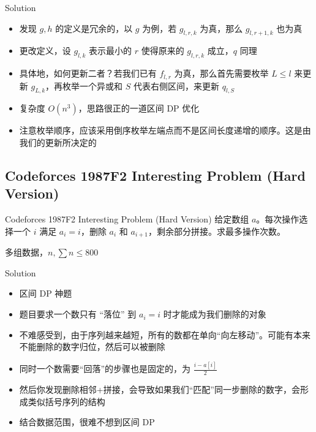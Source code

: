 ﻿\documentclass[aspectratio=169]{ctexbeamer}
\begin{document}
\begin{frame}{Solution}
    \begin{itemize}
        \item 发现 $g,h$ 的定义是冗余的，以 $g$ 为例，若 $g_{l,r,k}$ 为真，那么 $g_{l,r+1,k}$ 也为真
        \item 更改定义，设 $g_{l,k}$ 表示最小的 $r$ 使得原来的 $g_{l,r,k}$ 成立，$q$ 同理
        \item 具体地，如何更新二者？若我们已有 $f_{l,r}$ 为真，那么首先需要枚举 $L\le l$ 来更新 $g_{L,k}$，再枚举一个异或和 $S$ 代表右侧区间，来更新 $q_{l,S}$
        \item 复杂度 $O(n^3)$，思路很正的一道区间 DP 优化
        \item 注意枚举顺序，应该采用倒序枚举左端点而不是区间长度递增的顺序。这是由我们的更新所决定的 
    \end{itemize}
\end{frame}













\subsection{Codeforces 1987F2 Interesting Problem (Hard Version)}
\begin{frame}{Codeforces 1987F2 Interesting Problem (Hard Version)}
    给定数组 $a$。每次操作选择一个 $i$ 满足 $a_i=i$，删除 $a_i$ 和 $a_{i+1}$，剩余部分拼接。求最多操作次数。
    
    多组数据，$n,\sum n\le 800$
\end{frame}

\begin{frame}{Solution}
    \begin{itemize}
        \item 区间 DP 神题
        \item 题目要求一个数只有 “落位” 到 $a_i=i$ 时才能成为我们删除的对象
        \item 不难感受到，由于序列越来越短，所有的数都在单向“向左移动”。可能有本来不能删除的数字归位，然后可以被删除
        \item 同时一个数需要“回落”的步骤也是固定的，为 $\frac{i-a[i]}{2}$
        \item 然后你发现删除相邻+拼接，会导致如果我们“匹配”同一步删除的数字，会形成类似括号序列的结构
        \item 结合数据范围，很难不想到区间 DP
    \end{itemize}
\end{frame}
\end{document}
